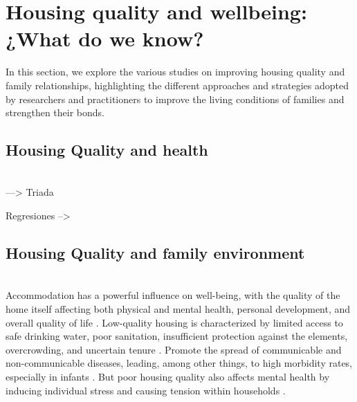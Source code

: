 \section{Housing quality and wellbeing: ¿What do we know?}
        
        In this section, we explore the various studies on improving housing quality and family relationships, highlighting the different approaches and strategies adopted by researchers and practitioners to improve the living conditions of families and strengthen their bonds.

    \subsection{Housing Quality and health} \\


    ---> Triada 

    Regresiones 
        -->
    
    \subsection{Housing Quality and family environment} \\

        Accommodation has a powerful influence on well-being, with the quality of the home itself affecting both physical and mental health, personal development, and overall quality of life \cite{cattaneo2009housing, galiani2017shelter, jaitman_evaluation_2013}. Low-quality housing is characterized by limited access to safe drinking water, poor sanitation, insufficient protection against the elements, overcrowding, and uncertain tenure \cite{behr2021introducing, sclar200521st}. Promote the spread of communicable and non-communicable diseases, leading, among other things, to high morbidity rates, especially in infants \cite{behr2021introducing, sclar200521st, takeuchi_measuring_2008}. But poor housing quality also affects mental health by inducing individual stress and causing tension within households \cite{devoto2012happiness}.  \\

